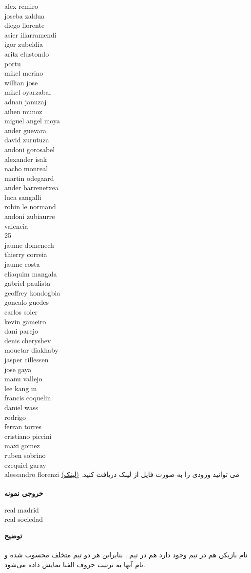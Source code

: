 \documentclass[]{article}
\newcommand{\outputsample}[1]{
    ~\\
    \textbf{خروجی نمونه}

    \begin{tcolorbox}[breakable,boxrule=0pt]
        \begin{latin}
            \large{
                #1
            }
        \end{latin}
    \end{tcolorbox}
}
\begin{document}
{alex remiro\\
joseba zaldua\\
diego llorente\\
asier illarramendi\\
igor zubeldia\\
aritz elustondo\\
portu\\
mikel merino\\
willian jose\\
mikel oyarzabal\\
adnan januzaj\\
aihen munoz\\
miguel angel moya\\
ander guevara\\
david zurutuza\\
andoni gorosabel\\
alexander isak\\
nacho monreal\\
martin odegaard\\
ander barrenetxea\\
luca sangalli\\
robin le normand\\
andoni zubiaurre\\
valencia\\
25\\
jaume domenech\\
thierry correia\\
jaume costa\\
eliaquim mangala\\
gabriel paulista\\
geoffrey kondogbia\\
goncalo guedes\\
carlos soler\\
kevin gameiro\\
dani parejo\\
denis cheryshev\\
mouctar diakhaby\\
jasper cillessen\\
jose gaya\\
manu vallejo\\
lee kang in\\
francis coquelin\\
daniel wass\\
rodrigo\\
ferran torres\\
cristiano piccini\\
maxi gomez\\
ruben sobrino\\
ezequiel garay\\
alessandro florenzi
}
می توانید ورودی را به صورت فایل از لینک دریافت کنید.  \href{https://drive.google.com/open?id=1kFdhIPI82gLngk7dly7HnbF0940MbF9r}{(لینک)}
\\
\outputsample{
real madrid\\
real sociedad
}
\textbf{توضیح}\\\\
نام بازیکن
 هم در تیم
 وجود دارد هم در تیم
 . بنابراین هر دو تیم متخلف محسوب شده و نام آنها به ترتیب حروف الفبا نمایش داده می‌شود.
\end{document}
